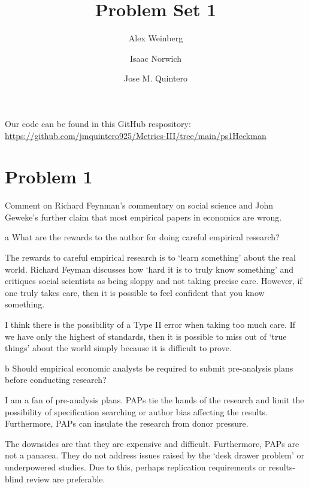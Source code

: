 \documentclass{article}
\title{Problem Set 1}
\author{Alex Weinberg \and Isaac Norwich \and Jose M. Quintero}
\begin{document}
\maketitle

Our code can be found in this GitHub respository: \url{https://github.com/jmquintero925/Metrics-III/tree/main/ps1Heckman}


\section*{Problem 1}
Comment on Richard Feynman’s commentary on social science and John Geweke’s further claim that most empirical papers in economics are wrong.
\begin{problem}{a}
What are the rewards to the author for doing careful empirical research?
\end{problem}

\begin{solution}
The rewards to careful empirical research is to `learn something' about the real world. 
Richard Feyman discusses how `hard it is to truly know something' and critiques social scientists as being sloppy and not taking precise care. However, if one truly takes care, then it is possible to feel confident that you know something. 

I think there is the possibility of a Type II error when taking too much care. If we have only the highest of standards, then it is possible to miss out of `true things' about the world simply because it is difficult to prove. 
\end{solution}

\begin{problem}{b}
Should empirical economic analysts be required to submit pre-analysis
plans before conducting research?
\end{problem}

\begin{solution}
I am a fan of pre-analysis plans. PAPs tie the hands of the research and limit the possibility of specification searching or author bias affecting the results. Furthermore, PAPs can insulate the research from donor pressure.

The downsides are that they are expensive and difficult. Furthermore, PAPs are not a panacea. They do not address issues raised by the `desk drawer problem' or underpowered studies. Due to this, perhaps replication requirements or results-blind review are preferable. 

\end{solution}
\end{document}
